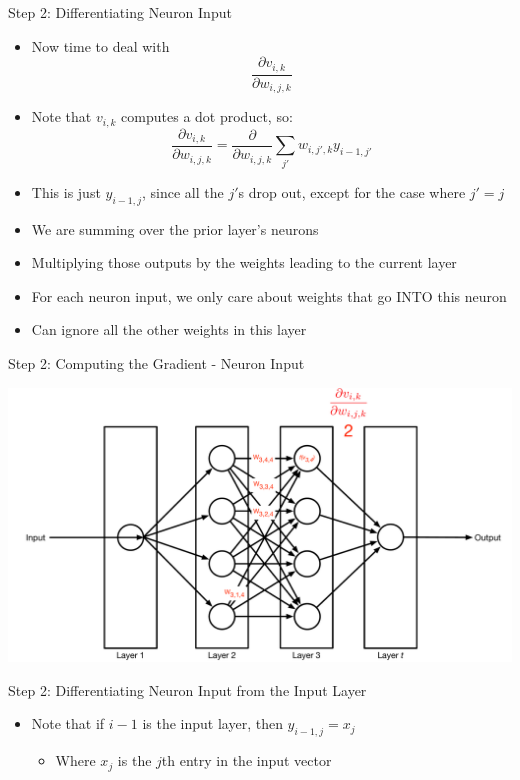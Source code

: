 \documentclass[aspectratio=169]{beamer}
\begin{document}
\begin{frame}{Step 2: Differentiating Neuron Input}

\begin{itemize} 
	\item Now time to deal with
	$$\frac{\partial v_{i,k}}{\partial w_{i,j,k}}$$
	\item Note that $v_{i,k}$ computes a dot product, so:
	$$\frac{\partial v_{i,k}}{\partial w_{i,j,k}} = \frac{\partial}{\partial w_{i,j,k}} 
		\sum_{j'} w_{i,j',k} y_{i-1,j'}$$
	\item This is just $y_{i-1,j}$, since all the $j'$s drop out, except for the case where $j'=j$
	\item We are summing over the prior layer's neurons
	\item Multiplying those outputs by the weights leading to the current layer
	\item For each neuron input, we only care about weights that go INTO this neuron
	\item Can ignore all the other weights in this layer
\end{itemize}
\end{frame}
\begin{frame}{Step 2: Computing the Gradient - Neuron Input}

\includegraphics[width=1\textwidth]{lectBP/nnbpStep2.pdf}
\end{frame}
\begin{frame}{Step 2: Differentiating Neuron Input from the Input Layer}

\begin{itemize} 
	\item Note that if $i-1$ is the input layer, then $y_{i-1,j} = x_j$
		\begin{itemize}
		\item Where $x_j$ is the $j$th entry in the input vector
		\end{itemize}
\end{itemize}
\end{frame}
\end{document}

